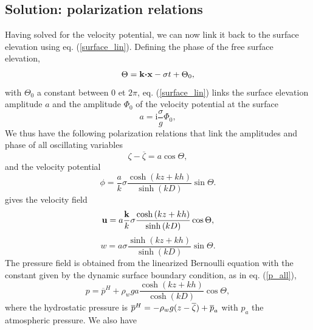 \subsection{Solution: polarization relations}
Having solved for the velocity potential, we can now link it back to the surface elevation using eq. (\ref{surface_lin}). 
Defining the phase of the free surface elevation, 
\begin{equation}
   \Theta={\mathbf
k}\mbox{\boldmath $\cdot$}{\mathbf x}-\sigma t+ \Theta_0, \label{eq:phase}
\end{equation}
 with $\Theta_0$ a constant between 0
et $2\pi$, eq. (\ref{surface_lin}) links the surface elevation amplitude $a$ and the amplitude $\Phi_{0}$ of the velocity potential at the surface 
\begin{equation}
    a={\mathrm i}\frac{\sigma}{g}\Phi_{0},\label{afromPhi0}
\end{equation}
 We thus have  the  following 
polarization relations that link the amplitudes and phase of all oscillating variables 
\begin{equation}
    \zeta-\overline{\zeta}=a \cos \Theta,\label{polzeta}
\end{equation}
and the velocity potential 
\begin{equation}
    \phi=  \frac{a}{k}\sigma
    \frac{\cosh\left(kz+kh\right)}{\sinh\left(kD\right)}
    \sin \Theta.
      \label{potentielcos}
\end{equation}
gives the velocity field
\begin{equation}
    \mathbf{u}= a \frac{{\mathbf k}}{k}\sigma
    \frac{\cosh\left(kz+kh\right)}{\sinh\left(kD\right)}
    \cos \Theta,
      \label{vitesse}
\end{equation}
\begin{equation}
    w=a \sigma
    \frac{\sinh\left(kz+kh\right)}{\sinh\left(kD\right)}
    \sin \Theta. \label{eq:w}
\end{equation}
The pressure field is obtained from the linearized Bernoulli equation with the constant 
given by the dynamic surface boundary condition, as in eq. (\ref{p_all}), 
\begin{equation}
    p=\overline{p}^H+\rho_w g a
    \frac{\cosh\left(kz+kh\right)}{\cosh\left(kD\right)}
    \cos \Theta,
      \label{pression}
\end{equation}
where the hydrostatic pressure is $\overline{p}^H=-\rho_w g
(z-\overline{\zeta})+\overline{p}_a$ with ${p}_a$ the atmospheric pressure. 
We also have






